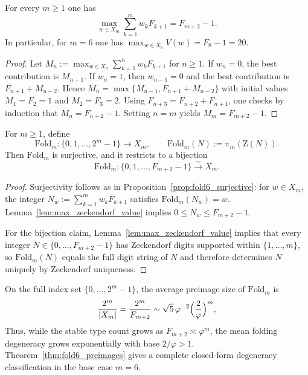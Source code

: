 \begin{lemma}
\label{lem:max_zeckendorf_value}
For every $m\ge 1$ one has
\[
\max_{w\in X_m}\sum_{k=1}^m w_k F_{k+1}=F_{m+2}-1.
\]
In particular, for $m=6$ one has $\max_{w\in X_6} V(w)=F_8-1=20$.
\end{lemma}

\begin{proof}
Let $M_n:=\max_{w\in X_n}\sum_{k=1}^n w_k F_{k+1}$ for $n\ge 1$.
If $w_n=0$, the best contribution is $M_{n-1}$.
If $w_n=1$, then $w_{n-1}=0$ and the best contribution is $F_{n+1}+M_{n-2}$.
Hence $M_n=\max\{M_{n-1},F_{n+1}+M_{n-2}\}$ with initial values $M_1=F_2=1$ and $M_2=F_3=2$.
Using $F_{n+3}=F_{n+2}+F_{n+1}$, one checks by induction that $M_n=F_{n+2}-1$.
Setting $n=m$ yields $M_m=F_{m+2}-1$.
\end{proof}

\begin{proposition}
\label{prop:foldm_bijection}
For $m\ge 1$, define
\[
\mathrm{Fold}_m:\{0,1,\dots,2^m-1\}\to X_m,
\qquad
\mathrm{Fold}_m(N):=\pi_m(\mathrm{Z}(N)).
\]
Then $\mathrm{Fold}_m$ is surjective, and it restricts to a bijection
\[
\mathrm{Fold}_m:\{0,1,\dots,F_{m+2}-1\}\xrightarrow{\sim} X_m.
\]
\end{proposition}

\begin{proof}
Surjectivity follows as in Proposition~\ref{prop:fold6_surjective}: for $w\in X_m$, the integer $N_w:=\sum_{k=1}^m w_k F_{k+1}$ satisfies $\mathrm{Fold}_m(N_w)=w$.
Lemma~\ref{lem:max_zeckendorf_value} implies $0\le N_w\le F_{m+2}-1$.

For the bijection claim, Lemma~\ref{lem:max_zeckendorf_value} implies that every integer $N\in\{0,\dots,F_{m+2}-1\}$ has Zeckendorf digits supported within $\{1,\dots,m\}$, so $\mathrm{Fold}_m(N)$ equals the full digit string of $N$ and therefore determines $N$ uniquely by Zeckendorf uniqueness.
\end{proof}

\begin{remark}
On the full index set $\{0,\dots,2^m-1\}$, the average preimage size of $\mathrm{Fold}_m$ is
\[
\frac{2^m}{|X_m|}=\frac{2^m}{F_{m+2}}\sim \sqrt{5}\,\varphi^{-2}\Bigl(\frac{2}{\varphi}\Bigr)^m,
\]
Thus, while the stable type count grows as $F_{m+2}\asymp\varphi^m$, the mean folding degeneracy grows exponentially with base $2/\varphi>1$.
Theorem~\ref{thm:fold6_preimages} gives a complete closed-form degeneracy classification in the base case $m=6$.
\end{remark}

